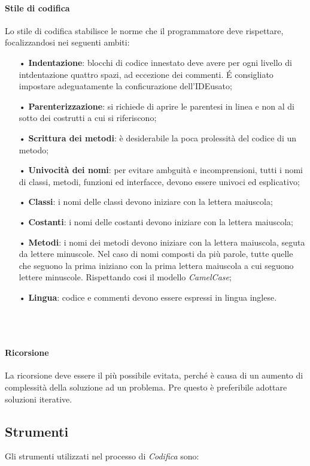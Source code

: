		\paragraph{Stile di codifica}
		Lo stile di codifica stabilisce le norme che il programmatore deve rispettare, focalizzandosi nei seguenti ambiti:
		\begin{itemize}
			\item[•] \textbf{Indentazione}: blocchi di codice innestato deve avere per ogni livello di intdentazione quattro spazi, ad eccezione dei commenti. \'E consigliato impostare adeguatamente la conficurazione dell'IDE\glo usato;
			\item[•] \textbf{Parenterizzazione}: si richiede di aprire le parentesi in linea e non al di sotto dei costrutti a cui si riferiscono;
			\item[•] \textbf{Scrittura dei metodi}: è desiderabile la poca prolessità del codice di un metodo;
			\item[•] \textbf{Univocità dei nomi}: per evitare ambguità e incomprensioni, tutti i nomi di classi, metodi, funzioni ed interfacce, devono essere univoci ed esplicativo;
			\item[•] \textbf{Classi}: i nomi delle classi devono iniziare con la lettera maiuscola;
			\item[•] \textbf{Costanti}: i nomi delle costanti devono iniziare con la lettera maiuscola;
			\item[•] \textbf{Metodi}: i nomi dei metodi devono iniziare con la lettera maiuscola, seguta da lettere minuscole. Nel caso di nomi composti da più parole, tutte quelle che seguono la prima iniziano con la prima lettera maiuscola a cui seguono lettere minuscole. Rispettando cosi il modello \textit{CamelCase}\glo;
			\item[•] \textbf{Lingua}: codice e commenti devono essere espressi in lingua inglese.
		\end{itemize}
		\\
		\\
		\paragraph{Ricorsione}
		La ricorsione deve essere il più possibile evitata, perché è causa di un aumento di complessità della soluzione ad un problema. Pre questo è preferibile adottare soluzioni iterative.

	\subsection{Strumenti}
	Gli strumenti utilizzati nel processo di \textit{Codifica} sono:
